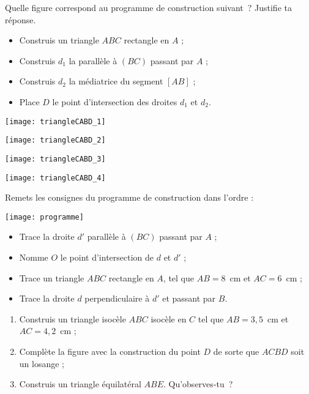 \begin{exercice}
Quelle figure correspond au programme de construction suivant ? Justifie ta réponse.

 \begin{itemize}
  \item Construis un triangle $ABC$ rectangle en $A$ ;
  \item Construis $d_1$ la parallèle à $(BC)$ passant par $A$ ;
  \item Construis $d_2$ la médiatrice du segment $[AB]$ ;
  \item Place $D$ le point d'intersection des droites $d_1$ et $d_2$.
  \end{itemize}
  \begin{colenumerate}{2}
   \item \texttt{[image: triangleCABD\_1]}
   \item \texttt{[image: triangleCABD\_2]}   
   \item \texttt{[image: triangleCABD\_3]}
   \item \texttt{[image: triangleCABD\_4]}
   \end{colenumerate}
\end{exercice}


\begin{exercice}
Remets les consignes du programme de construction dans l'ordre : \\[1em]
\begin{center} \texttt{[image: programme]} \end{center}
 \begin{itemize}
  \item Trace la droite $d'$ parallèle à $(BC)$ passant par $A$ ;
  \item Nomme $O$ le point d'intersection de $d$ et $d'$ ;
  \item Trace un triangle $ABC$ rectangle en $A$, tel que $AB = 8$ cm et $AC = 6$ cm ;
  \item Trace la droite $d$ perpendiculaire à $d'$ et passant par $B$.
  \end{itemize}
\end{exercice}


\begin{exercice}
 \begin{enumerate}
  \item Construis un triangle isocèle $ABC$ isocèle en $C$ tel que $AB = 3,5$ cm et $AC = 4,2$ cm ;
  \item Complète la figure avec la construction du point $D$ de sorte que $ACBD$ soit un losange ;
  \item Construis un triangle équilatéral $ABE$.
Qu'observes‑tu ?
   \end{enumerate}
\end{exercice}


